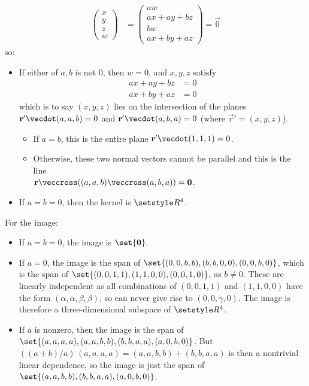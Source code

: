 \documentclass[fleqn,a4paper,11pt]{article}
\begin{document}
\begin{enumerate}[label=\textbf{\arabic*.}]
\begin{alignat*}
\begin{pmatrix}
      x \\ y \\ z \\ w
     \end{pmatrix}
      &=
      \begin{pmatrix}
       aw \\ ax + ay + bz \\ bw \\ ax + by + az
      \end{pmatrix}
      = \vec 0
    \end{alignat*}
    so:
    \begin{itemize}
     \item If either of \(a, b\) is not \(0\), then \(w = 0\), and \(x, y, z\)
           satisfy
      \begin{align*}
       ax + ay + bz &= 0 \\
       ax + by + az &= 0
      \end{align*}
      which is to say \((x, y, z)\) lies on the intersection of the planes
      \(\vec r' \vecdot (a, a, b) = 0\) and
      \(\vec r' \vecdot (a, b, a) = 0\) (where \(\vec r' = (x, y, z)\)).
      \begin{itemize}
       \item
        If \(a = b\), this is the entire plane
        \(\vec r' \vecdot (1, 1, 1) = 0\).
       \item
        Otherwise, these two normal vectors cannot be parallel and this is the
        line \\
        \(\vec r \veccross ((a, a, b) \veccross (a, b, a)) = \vec 0\).
      \end{itemize}
     \item If \(a = b = 0\), then the kernel is \(\Reals^4\).
    \end{itemize}
    For the image:
    \begin{itemize}
     \item
      If \(a = b = 0\), the image is \(\set{\vec 0}\).
     \item If \(a = 0\), the image is the span of
      \(\set{(0, 0, b, b), (b, b, 0, 0), (0, 0, b, 0)}\), which is the span of
      \(\set{(0, 0, 1, 1), (1, 1, 0, 0), (0, 0, 1, 0)}\), as \(b \ne 0\). These
      are linearly independent as all combinations of
      \((0, 0, 1, 1)\) and \((1, 1, 0, 0)\) have the form
      \((\alpha, \alpha, \beta, \beta)\), so can never give rise to
      \((0, 0, \gamma, 0)\). The image is therefore a three-dimensional subspace
      of \(\Reals^4\).
     \item If \(a\) is nonzero, then the image is the span of
      \(\set{(a, a, a, a), (a, a, b, b), (b, b, a, a), (a, 0, b, 0)}\).
      But \(((a + b)/a)\,(a, a, a, a) = (a, a, b, b) + (b, b, a, a)\) is then a
      nontrivial linear dependence, so the image is just the span of
      \(\set{(a, a, b, b), (b, b, a, a), (a, 0, b, 0)}\).


\end{itemize}
\end{enumerate}
\end{document}

